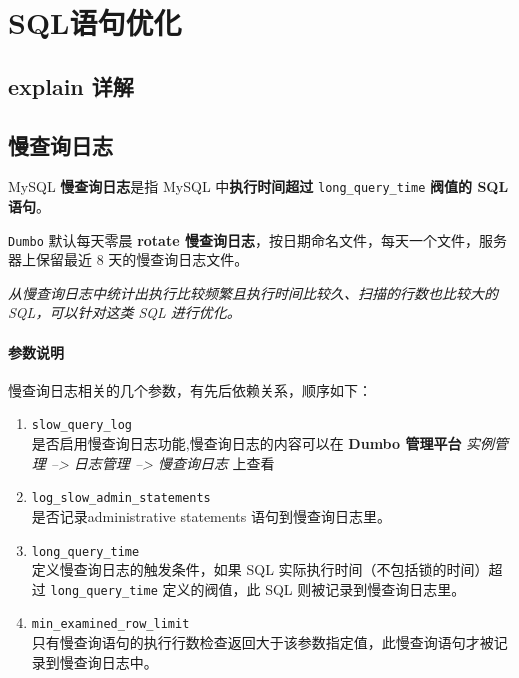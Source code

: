 \documentclass[UTF8,a4paper,12pt]{ctexbook}
\begin{document}
	\section{SQL语句优化}
		\subsection{explain 详解}
		
		
		\subsection{慢查询日志}
			MySQL \textbf{慢查询日志}是指 MySQL 中\textbf{执行时间超过} \verb|long_query_time| \textbf{阀值的 SQL 语句}。
			
			\verb|Dumbo| 默认每天零晨 \textbf{rotate 慢查询日志}，按日期命名文件，每天一个文件，服务器上保留最近 8 天的慢查询日志文件。
			
			\textit{从慢查询日志中统计出执行比较频繁且执行时间比较久、扫描的行数也比较大的 SQL，可以针对这类 SQL 进行优化。}
		
			\paragraph{参数说明}
				慢查询日志相关的几个参数，有先后依赖关系，顺序如下：
				\begin{enumerate}[itemindent = 2em, itemsep = 0pt,partopsep=0pt]
					\item \verb|slow_query_log| \\ 是否启用慢查询日志功能,慢查询日志的内容可以在 \textbf{Dumbo 管理平台} \textit{实例管理 --> 日志管理 --> 慢查询日志} 上查看
					\item \verb|log_slow_admin_statements| \\ 是否记录administrative statements 语句到慢查询日志里。
					\item \verb|long_query_time| \\ 定义慢查询日志的触发条件，如果 SQL 实际执行时间（不包括锁的时间）超过 \verb|long_query_time| 定义的阀值，此 SQL 则被记录到慢查询日志里。
					\item \verb|min_examined_row_limit| \\ 只有慢查询语句的执行行数检查返回大于该参数指定值，此慢查询语句才被记录到慢查询日志中。
				\end{enumerate}
				
\end{document}
